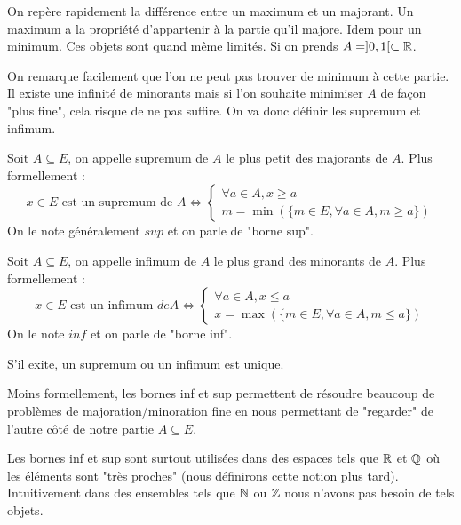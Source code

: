 \begin{remark}
    On repère rapidement la différence entre un maximum et un majorant. Un maximum a la propriété d'appartenir à la partie qu'il majore. 
    Idem pour un minimum. Ces objets sont quand même limités. Si on prends $A = ]0,1[ \subset \mathbb{R}$. 
    
    On remarque facilement 
    que l'on ne peut pas trouver de minimum à cette partie. Il existe une infinité de minorants mais si l'on souhaite minimiser 
    $A$ de façon "plus fine", cela risque de ne pas suffire. On va donc définir les supremum et infimum. 
\end{remark}

\begin{definition}[Supremum]
    Soit $A \subseteq E$, on appelle supremum de $A$ le plus petit des majorants de $A$. 
    Plus formellement :
        \[ x \in E \text{ est un supremum de } A \iff 
            \begin{cases}
                \forall a \in A, x \geqslant a \\
                m = \min(\{m \in E, \forall a \in A, m \geqslant a\})
            \end{cases}
        \]
    On le note généralement $sup$ et on parle de "borne sup". 
\end{definition}

\begin{definition}[Infimum]
    Soit $A \subseteq E$, on appelle infimum de $A$ le plus grand des minorants de $A$. 
    Plus formellement :
        \[ x \in E \text{ est un infimum } de A \iff 
            \begin{cases}
                \forall a \in A, x \leqslant a \\
                x = \max(\{m \in E, \forall a \in A, m \leqslant a\})
            \end{cases}
        \] 
    On le note $inf$ et on parle de "borne inf". 
\end{definition}

\begin{proposition}
    S'il exite, un supremum ou un infimum est unique. 
\end{proposition}

\begin{remark}
    Moins formellement, les bornes inf et sup permettent de résoudre beaucoup de problèmes de majoration/minoration
    fine en nous permettant de "regarder" de l'autre côté de notre partie $A \subseteq E$. 

    Les bornes inf et sup sont surtout utilisées dans des espaces tels que $\mathbb{R}$ et $\mathbb{Q}$ où les éléments sont "très proches"
    (nous définirons cette notion plus tard). Intuitivement dans des ensembles tels que $\mathbb{N}$ ou $\mathbb{Z}$ nous n'avons pas besoin 
    de tels objets. 
\end{remark}

